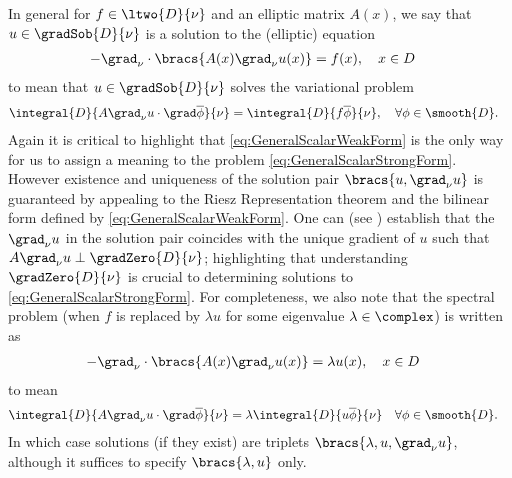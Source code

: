 In general for $f\in\ltwo{D}{\nu}$ and an elliptic matrix $A(x)$, we say that $u\in\gradSob{D}{\nu}$ is a solution to the (elliptic) equation
\begin{align} \label{eq:GeneralScalarStrongForm}
	-\grad_\nu \cdot \bracs{A(x)\grad_\nu u(x)} &= f(x), \quad x\in D
\end{align}
to mean that $u\in\gradSob{D}{\nu}$ solves the variational problem
\begin{align} \label{eq:GeneralScalarWeakForm}
	\integral{D}{A\grad_\nu u \cdot \grad\overline{\phi}}{\nu} &= \integral{D}{f\overline{\phi}}{\nu}, \quad \forall \phi\in\smooth{D}.
\end{align}
Again it is critical to highlight that \eqref{eq:GeneralScalarWeakForm} is the only way for us to assign a meaning to the problem \eqref{eq:GeneralScalarStrongForm}.
However existence and uniqueness of the solution pair $\bracs{u,\grad_\nu u}$ is guaranteed by appealing to the Riesz Representation theorem and the bilinear form defined by \eqref{eq:GeneralScalarWeakForm}.
One can (see \cite{zhikov2000extension}) establish that the $\grad_\nu u$ in the solution pair coincides with the unique gradient of $u$ such that $A\grad_\nu u \perp \gradZero{D}{\nu}$; highlighting that understanding $\gradZero{D}{\nu}$ is crucial to determining solutions to \eqref{eq:GeneralScalarStrongForm}.
For completeness, we also note that the spectral problem (when $f$ is replaced by $\lambda u$ for some eigenvalue $\lambda\in\complex$) is written as
\begin{align*}
	-\grad_\nu \cdot \bracs{A(x)\grad_\nu u(x)} &= \lambda u(x), \quad x\in D
\end{align*}
to mean
\begin{align*}
	\integral{D}{A\grad_\nu u \cdot \grad\overline{\phi}}{\nu} &= \lambda\integral{D}{u\overline{\phi}}{\nu} \quad \forall \phi\in\smooth{D}.
\end{align*}
In which case solutions (if they exist) are triplets $\bracs{\lambda, u, \grad_\nu u}$, although it suffices to specify $\bracs{\lambda, u}$ only. \newline

